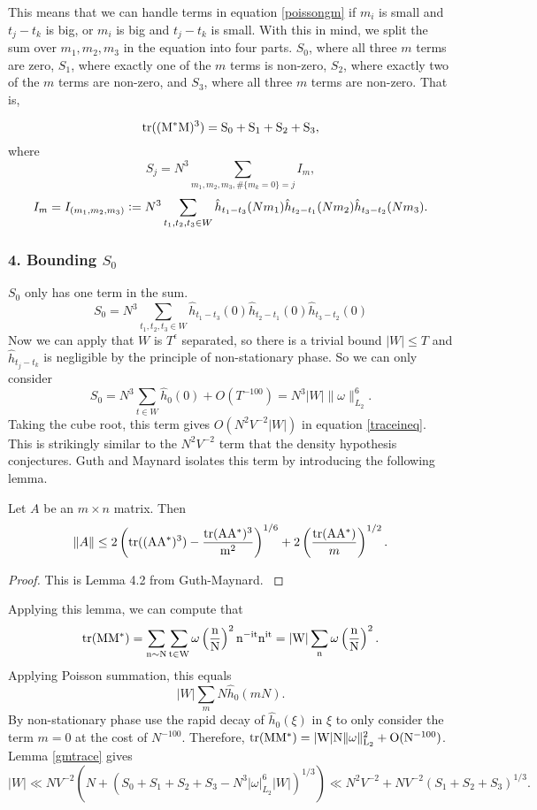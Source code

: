 This means that we can handle terms in equation \ref{poissongm} if $m_i$ is small and $t_j-t_k$ is big, or  $m_i$ is big and $t_j-t_k$ is small. With this in mind, we split the sum over $m_1,m_2,m_3$ in the equation into four parts. $S_0$, where all three $m$ terms are zero, $S_1$, where exactly one of the $m$ terms is non-zero, $S_2$, where exactly two of the $m$ terms are non-zero, and $S_3$, where all three $m$ terms are non-zero.
That is,

\[\rm{tr}((M^*M)^3)= S_0+S_1+S_2+S_3, \]
where \[
S_j = N^3\sum_{m_1,m_2,m_3, \#\{m_k=0\}=j} I_m,
\]
\[
I_m=I_{(m_1,m_2,m_3)}\mathrel{\mathop:}= N^3\sum_{t_1,t_2,t_3\in W}\hat{h}_{t_1-t_3}(Nm_1)\hat{h}_{t_2-t_1}(Nm_2)\hat{h}_{t_3-t_2}(Nm_3).
\]

\subsubsection*{4. Bounding $S_0$}
$S_0$ only has one term in the sum. \[
S_0 = N^3\sum_{t_1,t_2,t_3\in W} \hat{h}_{t_1-t_3}(0)\hat{h}_{t_2-t_1}(0)\hat{h}_{t_3-t_2}(0)
\]
Now we can apply that $W$ is $T^\epsilon$ separated, so there is a trivial bound $|W|\leq T$ and $\hat{h}_{t_j-t_k}$ is negligible by the principle of non-stationary phase. So we can only consider \[
S_0 = N^3\sum_{t\in W}\hat{h}_0(0) + O(T^{-100}) = N^3|W|\|\omega\|_{L_2}^6.
\]Taking the cube root, this term gives $O(N^2V^{-2}|W|)$ in equation \ref{traceineq}. This is strikingly similar to the $N^2V^{-2}$ term that the density hypothesis conjectures. Guth and Maynard isolates this term by introducing the following lemma.
\begin{lemma}\label{gmtrace}
    Let $A$ be an $m\times n$ matrix. Then 
    \[\|A\| \leq 2\left(\rm{tr}((AA^*)^3)-\frac{\rm{tr}(AA^*)^3}{m^2}\right)^{1/6}+2\left(\frac{\rm{tr}(AA^*)}{m}\right)^{1/2}.
    \]
\end{lemma}
\begin{proof}
    This is Lemma 4.2 from Guth-Maynard. \cite{}
\end{proof}
Applying this lemma, we can compute that \[
    \rm{tr}(MM^*) =\sum_{n\sim N} \sum_{t\in W} \omega\left(\frac{n}{N}\right)^2 n^{-it} n^{it}= |W|\sum_n \omega\left(\frac{n}{N}\right)^2.
\]
Applying Poisson summation, this equals \[
    |W|\sum_m N \hat{h}_0(mN).
\]
By non-stationary phase use the rapid decay of $\hat{h}_0(\xi)$ in $\xi$ to only consider the term $m=0$ at the cost of $N^{-100}$.
Therefore, $\rm{tr}(MM^*)=|W|N\|\omega\|_{L_2}^2+O(N^{-100})$.
Lemma \ref{gmtrace} gives \[
|W|\ll NV^{-2}(N+(S_0+S_1+S_2+S_3-N^3|\omega|_{L_2}^6|W|)^{1/3}) \ll N^2V^{-2}+  NV^{-2}(S_1+S_2+S_3)^{1/3}. 
\]


